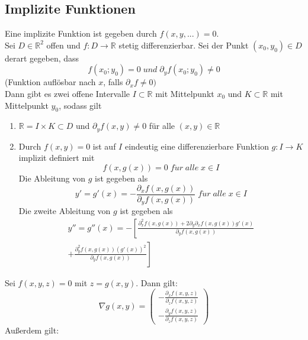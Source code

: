 \documentclass[a4paper,twocolumn,10pt]{article}
\begin{document}
\subsection{Implizite Funktionen}
Eine implizite Funktion ist gegeben durch $f(x,y,...)=0$.\\
Sei $D\in\mathbb{R}^2$ offen und $f:D\rightarrow\mathbb{R}$ stetig differenzierbar. Sei der Punkt $(x_0,y_0)\in D$ derart gegeben, dass
\begin{equation*}
f(x_0;y_0)=0\;und\;\partial_y f(x_0;y_0)\neq 0
\end{equation*}
(Funktion auflösbar nach $x$, falls $\partial_x f\neq 0)$\\
Dann gibt es zwei offene Intervalle $I\subset \mathbb{R}$ mit Mittelpunkt $x_0$ und $K\subset\mathbb{R}$ mit Mittelpunkt $y_0$, sodass gilt
\begin{enumerate}[label=$\bullet$]
\item $\mathbb{R}=I\times K\subset D$ und $\partial_y f(x,y)\neq 0$ für alle $(x,y)\in\mathbb{R}$
\item Durch $f(x,y)=0$ ist auf $I$ eindeutig eine differenzierbare Funktion $g:I\rightarrow K$ implizit definiert mit
\begin{equation*}
f(x,g(x))=0\;f\ddot{u}r\;alle\;x\in I
\end{equation*}
Die Ableitung von $g$ ist gegeben als
\begin{equation*}
y'=g'(x)=-\frac{\partial_x f(x,g(x))}{\partial_y f(x,g(x))}\;f\ddot{u}r\;alle\;x\in I
\end{equation*}
Die zweite Ableitung von $g$ ist gegeben als
\begin{equation*}
\begin{split}
y''=g''(x)=-\left[\frac{\partial_x^2 f(x,g(x))+2\partial_y \partial_x f(x,g(x))g'(x)}{\partial_y f(x,g(x))}\right. \\ \left.+\frac{\partial_y^2 f(x,g(x))(g'(x))^2}{\partial_y f(x,g(x))}\right]\end{split}
\end{equation*}
\end{enumerate}
Sei $f(x,y,z)=0$ mit $z=g(x,y)$. Dann gilt:
\begin{equation*}
\nabla g(x,y)=\begin{pmatrix}-\frac{\partial_x f(x,y,z)}{\partial_z f(x,y,z)} \\ -\frac{\partial_y f(x,y,z)}{\partial_z f(x,y,z)}\end{pmatrix}
\end{equation*}
Außerdem gilt:\\
\end{document}
